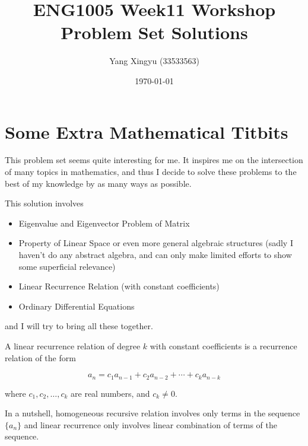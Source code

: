 \documentclass[12pt,a4paper]{article}
\begin{document}
\title{ENG1005 Week11 Workshop Problem Set Solutions}
\author{Yang Xingyu (33533563)}
\date{\today}
\maketitle

\section*{Some Extra Mathematical Titbits}

This problem set seems quite interesting for me. It inspires me on the intersection of many topics in mathematics, and thus I decide to solve these problems to the best of my knowledge by as many ways as possible. 

This solution involves
\begin{itemize}
    \item Eigenvalue and Eigenvector Problem of Matrix
    \item Property of Linear Space or even more general algebraic structures (sadly I haven't do any abstract algebra, and can only make limited efforts to show some superficial relevance)
    \item Linear Recurrence Relation (with constant coefficients)
    \item Ordinary Differential Equations
\end{itemize}

and I will try to bring all these together.

\begin{definition}\label{11:def_recc}
A linear recurrence relation of degree $k$ with constant coefficients is a recurrence relation of the form

$$
a_n=c_1 a_{n-1}+c_2 a_{n-2}+\cdots+c_k a_{n-k}
$$

where $c_1, c_2, \ldots, c_k$ are real numbers, and $c_k \neq 0$.
\end{definition}
In a nutshell, homogeneous recursive relation involves only terms in the sequence $\{a_n\}$ and linear recurrence only involves linear combination of terms of the sequence.
\end{document}
